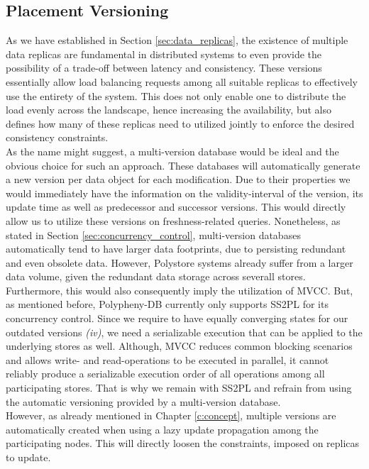 \subsection{Placement Versioning}

As we have established in Section \ref{sec:data_replicas}, the existence of multiple data replicas are fundamental in distributed systems to even provide the 
possibility of a trade-off between latency and consistency. These versions essentially allow load balancing requests among all suitable replicas to effectively 
use the entirety of the system. This does not only enable one to distribute the load evenly across the landscape, hence increasing the availability,
but also defines how many of these replicas need to utilized jointly to enforce the desired consistency constraints.\\
As the name might suggest, a multi-version database would be ideal and the obvious choice for such an approach.
These databases will automatically generate a new version per data object for each modification. 
Due to their properties we would immediately have the information on the validity-interval of the version, its update time as well as predecessor and successor versions.
This would directly allow us to utilize these versions on freshness-related queries. 
Nonetheless, as stated in Section \ref{sec:concurrency_control}, multi-version databases automatically tend to have larger data footprints, due to persisting  
redundant and even obsolete data.
However, Polystore systems already suffer from a larger data volume, given the redundant data storage across severall stores.
Furthermore, this would also consequently imply the utilization of MVCC.
But, as mentioned before, Polypheny-DB currently only supports SS2PL for its concurrency control.
Since we require to have equally converging states for our outdated versions \textit{(iv)}, we need a serializable execution that can be applied to 
the underlying stores as well.
Although, MVCC reduces common blocking scenarios and allows write- and read-operations to be executed in parallel, 
it cannot reliably produce a serializable execution order of all operations among all participating stores.
That is why we remain with SS2PL and refrain from using the automatic versioning provided by a multi-version database.\\
However, as already mentioned in Chapter \ref{c:concept}, multiple versions are automatically created when using a lazy update propagation among the participating nodes. 
This will directly loosen the constraints, imposed on replicas to update. 
